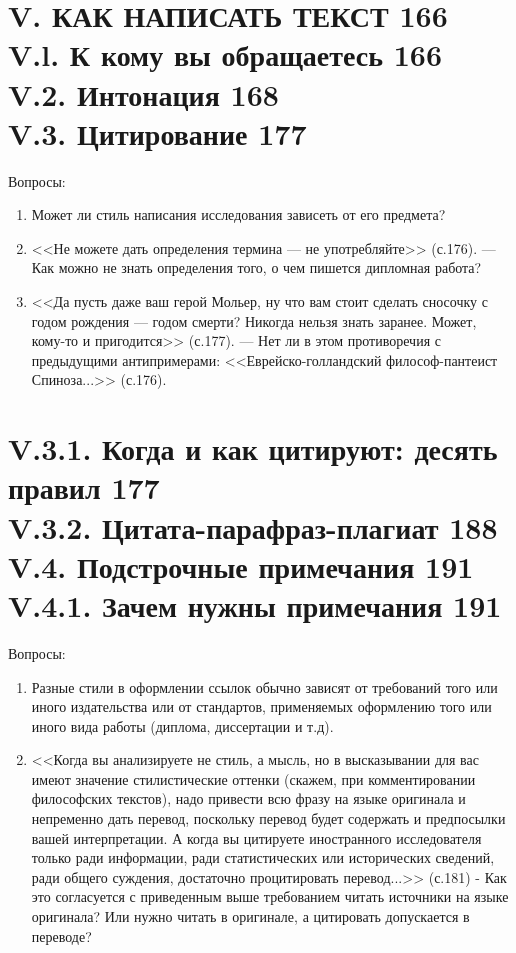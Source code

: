 \documentclass{../../common/thesisbyxetex}
\begin{document}
\section*{V. \uppercase{Как написать текст} 166 \\
V.l. К кому вы обращаетесь 166 \\
V.2. Интонация 168 \\
V.3. Цитирование 177}
Вопросы:
\begin{enumerate}
\item Может ли стиль написания исследования зависеть от его предмета?

\item <<Не можете дать определения термина --- не употребляйте>> (с.176). --- Как можно не знать определения того, о
чем пишется дипломная работа?

\item <<Да пусть даже ваш герой Мольер, ну что вам стоит сделать сносочку с годом рождения --- годом смерти? Никогда
нельзя знать заранее. Может, кому-то и пригодится>> (с.177). --- Нет ли в этом противоречия с предыдущими
антипримерами: <<Еврейско-голландский философ-пантеист Спиноза...>> (с.176).
\end{enumerate}

\section*{V.3.1. Когда и как цитируют: десять правил 177 \\
V.3.2. Цитата-парафраз-плагиат 188 \\
V.4. Подстрочные примечания 191 \\
V.4.1. Зачем нужны примечания 191}
Вопросы:
\begin{enumerate}
\item Разные стили в оформлении ссылок обычно зависят от требований того или иного издательства или от стандартов,
применяемых оформлению того или иного вида работы (диплома, диссертации и т.д).

\item <<Когда вы анализируете не стиль, а мысль, но в высказывании для вас имеют значение стилистические оттенки
(скажем, при комментировании философских текстов), надо привести всю фразу на языке оригинала и непременно дать
перевод, поскольку перевод будет содержать и предпосылки вашей интерпретации. А когда вы цитируете иностранного
исследователя только ради информации, ради статистических или исторических сведений, ради общего суждения, достаточно
процитировать перевод...>> (с.181) - Как это согласуется с приведенным выше требованием читать источники на языке
оригинала? Или нужно читать в оригинале, а цитировать допускается в переводе?
\end{enumerate}
\end{document}
